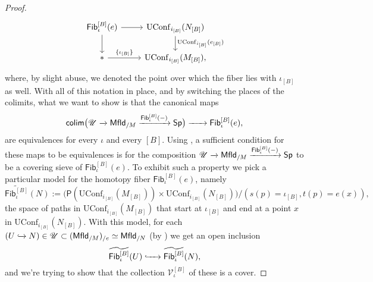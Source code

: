 \documentclass[../text]{subfiles}
\begin{document}
\begin{proof}
\begin{equation}
        \begin{tikzcd}
            \mathsf{Fib}_\iota^{[B]}(e) \arrow[d] \arrow[r] & \mathrm{UConf}_{i_{[B]}}(N_{[B]}) \arrow[d, "\mathrm{UConf}_{i_{[B]}}(e_{[B]})"] \\
            * \arrow[r, "\{\iota_{[B]}\}"] & \mathrm{UConf}_{i_{[B]}}(M_{[B]}),
        \end{tikzcd}
    \end{equation}
    where, by slight abuse, we denoted the point over which the fiber lies with $\iota_{[B]}$ as well. With all of this notation in place, and by switching the places of the colimits, what we want to show is that the canonical maps
    \begin{equation}
        \mathsf{colim} \big( \mathscr{U} \xrightarrow{} \mfld[r]_{/M} \xrightarrow{\mathsf{Fib}_{\iota}^{[B]}(-)} \mathsf{Sp} \big) \xrightarrow{\ \ \ \ \ } \mathsf{Fib}_{\iota}^{[B]}(e),
    \end{equation}
    are equivalences for every $\iota$ and every $[B]$. Using \cite[Prop.A.3.2]{lurie_ha}, a sufficient condition for these maps to be equivalences is for the composition $\mathscr{U} \xrightarrow{} \mfld[r]_{/M} \xrightarrow{\mathsf{Fib}_{\iota}^{[B]}(-)} \mathsf{Sp}$ to be a covering sieve of $\mathsf{Fib}_{\iota}^{[B]}(e)$. To exhibit such a property we pick a particular model for the homotopy fiber $\mathsf{Fib}_{\iota}^{[B]}(e)$, namely
    \begin{equation}
        \widetilde{\mathsf{Fib}_{\iota}^{[B]}}(N) := \big( \mathsf{P}(\mathrm{UConf}_{i_{[B]}}(M_{[B]})) \times \mathrm{UConf}_{i_{[B]}}(N_{[B]}) \big) / (s (p) = \iota_{[B]}, t (p) = e(x)),
    \end{equation}
    the space of paths in $\mathrm{UConf}_{i_{[B]}}(M_{[B]})$ that start at $\iota_{[B]}$ and end at a point $x$ in $\mathrm{UConf}_{i_{[B]}}(N_{[B]})$. With this model, for each $(U \xhookrightarrow{} N) \in \mathscr{U} \subset (\mfld[r]_{/M})_{/e} \simeq \mfld[r]_{/N}$ (by ) we get an open inclusion
    \begin{equation}
        \widetilde{\mathsf{Fib}_{\iota}^{[B]}}(U) \xhookrightarrow{\ \ \ \ } \widetilde{\mathsf{Fib}_{\iota}^{[B]}}(N),
    \end{equation}
    and we're trying to show that the collection $\mathscr{V}_{\iota}^{[B]}$ of these is a cover.


\end{proof}
\end{document}

